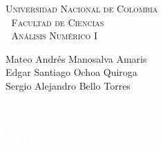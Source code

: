 \documentclass[12pt, a4paper]{article}%
\begin{document}
\setlength{\parindent}{0cm}
\hoffset-0.46cm
\voffset-1.46cm

\begin{window}
\large\scshape  \hspace{0.4cm}\textsf{Universidad Nacional de Colombia} \\
\textcolor{white}{\tiny.}  \large \hspace{1.5cm} \textsf{Facultad de Ciencias} \\
\textcolor{white}{\tiny.}   \normalsize\hspace{2.2cm}\textsf{Análisis Numérico I}\\
 

\end{window}

\vspace{0.2cm}
\small
\textsf{Mateo Andrés Manosalva Amaris\\
Edgar Santiago Ochoa Quiroga\\
Sergio Alejandro Bello Torres} 
\normalsize
\dotfill
\vspace{0.7cm}

\section*{\textcolor{white}{Ejercicios}}
\vspace*{-2cm} %






\end{document}
